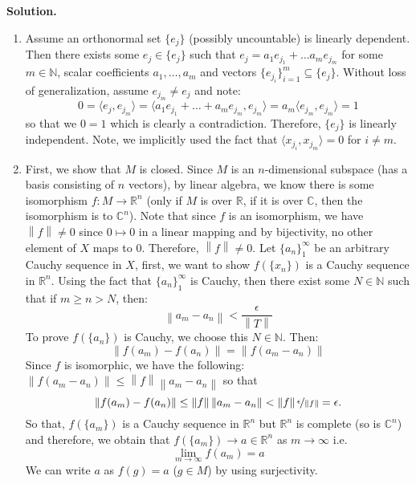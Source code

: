 \documentclass{article}
\newcommand{\norm}[1]{\left\lVert#1\right\rVert}
\begin{document}
    \textbf{Solution.}

    \begin{enumerate}
        \item Assume an orthonormal set $\{e_{j}\}$ (possibly uncountable) is linearly dependent. Then there exists some
            $e_j\in \{e_j\}$ such that $e_j = a_1e_{j_1} + \hdots a_me_{j_m}$ for some $m\in\mathbb{N}$, scalar coefficients 
            $a_1,\hdots,a_m$ and vectors $\{e_{j_i}\}_{i=1}^m\subseteq\{e_j\}$. Without loss of generalization, assume
            $e_{j_m}\neq e_j$ and note:
            \[0=\langle e_j,e_{j_m}\rangle = \langle a_1e_{j_1}+\hdots+a_me_{j_m},e_{j_m}\rangle = a_m\langle e_{j_m},e_{j_m}\rangle 
                = 1\]
            so that we $0=1$ which is clearly a contradiction. Therefore, $\{e_j\}$ is linearly independent. Note, we implicitly used
            the fact that $\langle x_{j_i},x_{j_m}\rangle = 0$ for $i\neq m$.
        \item First, we show that $M$ is closed. Since $M$ is an $n$-dimensional subspace (has a basis consisting of $n$ vectors),
            by linear algebra, we know there is some isomorphism $f: M\to \mathbb{R}^n$ (only if $M$ is over $\mathbb{R}$, if it
            is over $\mathbb{C}$, then the isomorphism is to $\mathbb{C}^n$).
            Note that since $f$ is an isomorphism, we have $\norm{f}\neq 0$ since $0\mapsto 0$ in a linear mapping and by bijectivity,
            no other element of $X$ maps to 0. Therefore, $\norm{f}\neq0$. Let $\{a_n\}_1^{\infty}$ be an arbitrary Cauchy sequence
            in $X$, first, we want to show $f(\{x_n\})$ is a Cauchy sequence in $\mathbb{R}^n$. Using the fact that $\{a_n\}_1^{\infty}$
            is Cauchy, then there exist some $N\in\mathbb{N}$ such that if $m\geq n>N$, then:
            \[ \norm{a_m - a_n} < \frac{\epsilon}{\norm{T}} \]
            To prove $f(\{a_n\})$ is Cauchy, we choose this $N\in\mathbb{N}$. Then:
            \[ \norm{f(a_m) - f(a_n)} = \norm{f(a_m-a_n)} \]
            Since $f$ is isomorphic, we have the following: $\norm{f(a_m-a_n)}\leq \norm{f}\norm{a_m-a_n}$ so that
            \[ \norm{f(a_m)-f(a_n)} \leq \norm{f}\norm{a_m-a_n} < \norm{f}\nicefrac{\epsilon}{\norm{f}} = \epsilon. \]
            So that, $f(\{a_m\})$ is a Cauchy sequence in $\mathbb{R}^n$ but $\mathbb{R}^n$ is complete (so is $\mathbb{C}^n$) and
            therefore, we obtain that $f(\{a_m\})\to a\in\mathbb{R}^n$ as $m\to\infty$ i.e.
            \[ \lim_{m\to\infty} f(a_m) = a \]
            We can write $a$ as $f(g) = a$ ($g\in M$) by using surjectivity. 

\end{enumerate}
\end{document}
